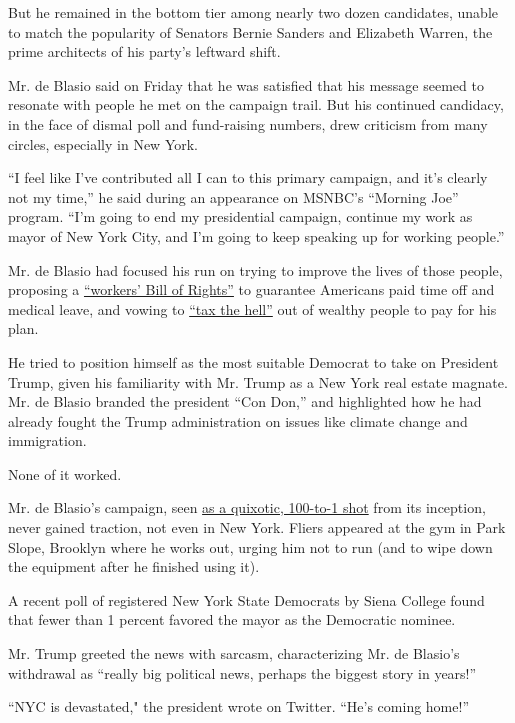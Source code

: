 But he remained in the bottom tier among nearly two dozen candidates,
unable to match the popularity of Senators Bernie Sanders and Elizabeth
Warren, the prime architects of his party's leftward shift.

Mr. de Blasio said on Friday that he was satisfied that his message
seemed to resonate with people he met on the campaign trail. But his
continued candidacy, in the face of dismal poll and fund-raising
numbers, drew criticism from many circles, especially in New York.

``I feel like I've contributed all I can to this primary campaign, and
it's clearly not my time,'' he said during an appearance on MSNBC's
``Morning Joe'' program. ``I'm going to end my presidential campaign,
continue my work as mayor of New York City, and I'm going to keep
speaking up for working people.''

Mr. de Blasio had focused his run on trying to improve the lives of
those people, proposing a
\href{https://www.buzzfeednews.com/article/billdeblasio/bill-de-blasio-working-peoples-bill-of-rights}{``workers'
Bill of Rights''} to guarantee Americans paid time off and medical
leave, and vowing to \href{https://www.taxthehell.com/}{``tax the
hell''} out of wealthy people to pay for his plan.

He tried to position himself as the most suitable Democrat to take on
President Trump, given his familiarity with Mr. Trump as a New York real
estate magnate. Mr. de Blasio branded the president ``Con Don,'' and
highlighted how he had already fought the Trump administration on issues
like climate change and immigration.

None of it worked.

Mr. de Blasio's campaign, seen
\href{https://www.nytimes.com/2019/05/10/nyregion/de-blasio-2020-president-ny.html}{as
a quixotic, 100-to-1 shot} from its inception, never gained traction,
not even in New York. Fliers appeared at the gym in Park Slope, Brooklyn
where he works out, urging him not to run (and to wipe down the
equipment after he finished using it).

A recent poll of registered New York State Democrats by Siena College
found that fewer than 1 percent favored the mayor as the Democratic
nominee.

Mr. Trump greeted the news with sarcasm, characterizing Mr. de Blasio's
withdrawal as ``really big political news, perhaps the biggest story in
years!''

``NYC is devastated," the president wrote on Twitter. ``He's coming
home!''

